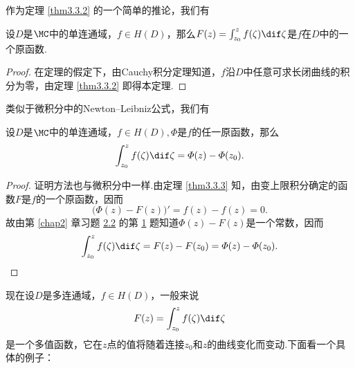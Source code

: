 作为定理 \ref{thm3.3.2} 的一个简单的推论，我们有
\begin{theorem}\label{thm3.3.3}
设$D$是$\MC$中的单连通域，$f\in H(D)$，那么$F(z)=\int_{z_0}^zf(\zeta)\dif \zeta$是$f$在$D$中的一个原函数.
\end{theorem}
\begin{proof}
在定理的假定下，由Cauchy积分定理知道，$f$沿$D$中任意可求长闭曲线的积分为零，由定理 \ref{thm3.3.2} 即得本定理.
\end{proof}

类似于微积分中的Newton--Leibniz公式，我们有
\begin{theorem}\label{thm3.3.4}
设$D$是$\MC$中的单连通域，$f\in H(D),\varPhi$是$f$的任一原函数，那么
\[\int_{z_0}^zf(\zeta)\dif \zeta=\varPhi(z)-\varPhi(z_0).\]
\end{theorem}
\begin{proof}
证明方法也与微积分中一样.由定理 \ref{thm3.3.3} 知，由变上限积分确定的函数$F$是$f$的一个原函数，因而
\[\big(\varPhi(z)-F(z)\big)'=f(z)-f(z)=0.\]
故由第 \ref{chap2} 章习题 \hyperlink{xiti2.2}{2.2} 的第 \hyperlink{xiti2.2.1}{1} 题知道$\varPhi(z)-F(z)$是一个常数，因而
\begin{equation*}
\int_{z_0}^zf(\zeta)\dif \zeta=F(z)-F(z_0)=\varPhi(z)-\varPhi(z_0).
\end{equation*}
\end{proof}

现在设$D$是多连通域，$f\in H(D)$，一般来说
\[F(z)=\int_{z_0}^zf(\zeta)\dif \zeta\]
是一个多值函数，它在$z$点的值将随着连接$z_0$和$z$的曲线变化而变动.下面看一个具体的例子：

